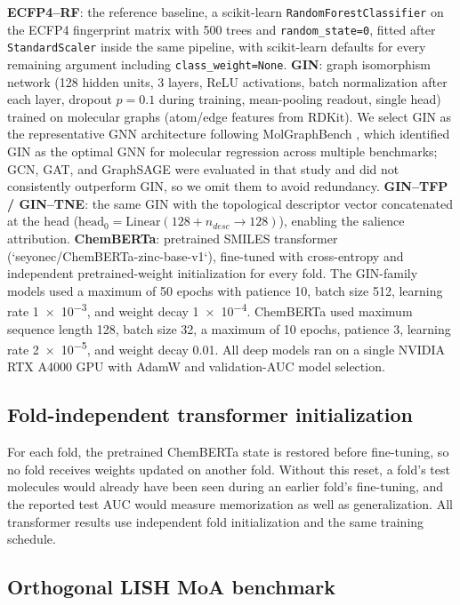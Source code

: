 \documentclass[11pt,a4paper]{article}
\begin{document}
\textbf{ECFP4--RF}: the reference baseline, a scikit-learn \texttt{RandomForestClassifier} on the ECFP4 fingerprint matrix with \num{500} trees and \texttt{random\_state=0}, fitted after \texttt{StandardScaler} inside the same pipeline, with scikit-learn defaults for every remaining argument including \texttt{class\_weight=None}. \textbf{GIN}: graph isomorphism network (\num{128} hidden units, \num{3} layers, ReLU activations, batch normalization after each layer, dropout $p=\num{0.1}$ during training, mean-pooling readout, single head) trained on molecular graphs (atom/edge features from RDKit). We select GIN as the representative GNN architecture following MolGraphBench \citep{guo_ding_2026}, which identified GIN as the optimal GNN for molecular regression across multiple benchmarks; GCN, GAT, and GraphSAGE were evaluated in that study and did not consistently outperform GIN, so we omit them to avoid redundancy. \textbf{GIN--TFP / GIN--TNE}: the same GIN with the topological descriptor vector concatenated at the head ($\mathrm{head}_0 = \mathrm{Linear}(\num{128} + n_{desc} \to \num{128})$), enabling the salience attribution. \textbf{ChemBERTa}: pretrained SMILES transformer (`seyonec/ChemBERTa-zinc-base-v1`), fine-tuned with cross-entropy and independent pretrained-weight initialization for every fold. The GIN-family models used a maximum of \num{50} epochs with patience \num{10}, batch size \num{512}, learning rate \num{1e-3}, and weight decay \num{1e-4}. ChemBERTa used maximum sequence length \num{128}, batch size \num{32}, a maximum of \num{10} epochs, patience \num{3}, learning rate \num{2e-5}, and weight decay \num{0.01}. All deep models ran on a single NVIDIA RTX A4000 GPU with AdamW and validation-AUC model selection.

\subsection{Fold-independent transformer initialization}

For each fold, the pretrained ChemBERTa state is restored before fine-tuning, so no fold receives weights updated on another fold. Without this reset, a fold's test molecules would already have been seen during an earlier fold's fine-tuning, and the reported test AUC would measure memorization as well as generalization. All transformer results use independent fold initialization and the same training schedule.

\subsection{Orthogonal LISH MoA benchmark}
\end{document}
